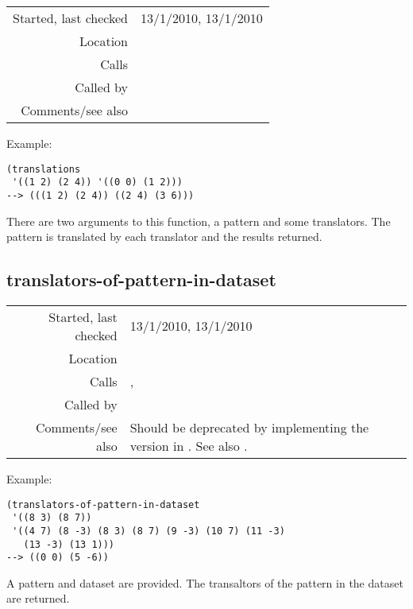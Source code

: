 \vspace{0.3cm}
\begin{tabular}{r|p{8cm}}
Started, last checked & 13/1/2010, 13/1/2010 \\
Location & \nameref{sec:set-operations} \\
Calls & \nameref{fun:translation} \\
Called by & \\
Comments/see also & \nameref{fun:translations-mod-2nd-n}
\end{tabular}

\vspace{0.5cm}
\noindent Example:
\begin{verbatim}
(translations
 '((1 2) (2 4)) '((0 0) (1 2)))
--> (((1 2) (2 4)) ((2 4) (3 6)))
\end{verbatim}

\noindent There are two arguments to this function, a
pattern and some translators. The pattern is
translated by each translator and the results
returned.


\subsection*{translators-of-pattern-in-dataset}\label{fun:translators-of-pattern-in-dataset}

\vspace{0.3cm}
\begin{tabular}{r|p{8cm}}
Started, last checked & 13/1/2010, 13/1/2010 \\
Location & \nameref{sec:set-operations} \\
Calls & \nameref{fun:check-potential-translators},\newline \nameref{fun:subtract-list-from-each-list} \\
Called by & \nameref{fun:translational-equivalence-class} \\
Comments/see also & Should be deprecated by implementing the version in \citet*{ukkonen2003}. See also \nameref{fun:translators-of-pattern-in-dataset-mod-2nd-n}.
\end{tabular}

\vspace{0.5cm}
\noindent Example:
\begin{verbatim}
(translators-of-pattern-in-dataset
 '((8 3) (8 7))
 '((4 7) (8 -3) (8 3) (8 7) (9 -3) (10 7) (11 -3)
   (13 -3) (13 1)))
--> ((0 0) (5 -6))
\end{verbatim}

\noindent A pattern and dataset are provided. The
transaltors of the pattern in the dataset are
returned.


